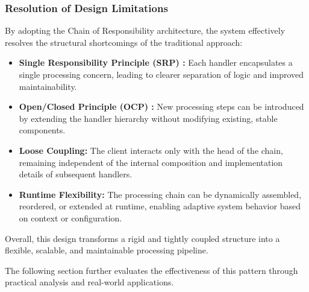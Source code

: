 \subsubsection{Resolution of Design Limitations}
By adopting the Chain of Responsibility architecture, the system effectively resolves the structural shortcomings of the traditional approach:

\begin{itemize}
    \item \textbf{Single Responsibility Principle (SRP) \cite{martin2000design}:} Each handler encapsulates a single processing concern, leading to clearer separation of logic and improved maintainability.
    
    \item \textbf{Open/Closed Principle (OCP) \cite{martin2000design}:} New processing steps can be introduced by extending the handler hierarchy without modifying existing, stable components.
    
    \item \textbf{Loose Coupling:} The client interacts only with the head of the chain, remaining independent of the internal composition and implementation details of subsequent handlers.
    
    \item \textbf{Runtime Flexibility:} The processing chain can be dynamically assembled, reordered, or extended at runtime, enabling adaptive system behavior based on context or configuration.
\end{itemize}

Overall, this design transforms a rigid and tightly coupled structure into a flexible, scalable, and maintainable processing pipeline.

The following section further evaluates the effectiveness of this pattern through practical analysis and real-world applications.